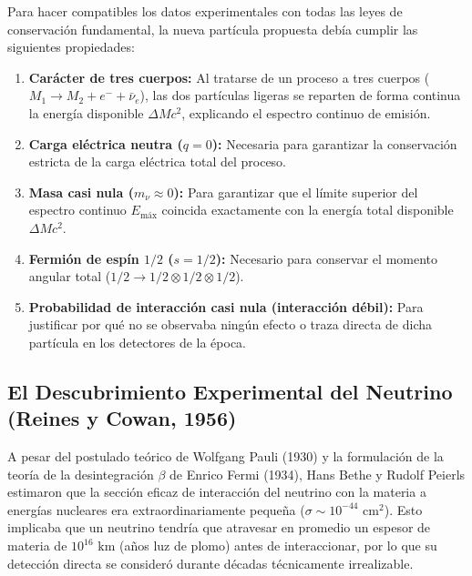 \begin{definicion}
Para hacer compatibles los datos experimentales con todas las leyes de conservación fundamental, la nueva partícula propuesta debía cumplir las siguientes propiedades:
\begin{enumerate}[label=\alph*)]
    \item \textbf{Carácter de tres cuerpos:} Al tratarse de un proceso a tres cuerpos ($M_1 \to M_2 + e^- + \bar{\nu}_e$), las dos partículas ligeras se reparten de forma continua la energía disponible $\Delta M c^2$, explicando el espectro continuo de emisión.
    \item \textbf{Carga eléctrica neutra ($q = 0$):} Necesaria para garantizar la conservación estricta de la carga eléctrica total del proceso.
    \item \textbf{Masa casi nula ($m_\nu \approx 0$):} Para garantizar que el límite superior del espectro continuo $E_{\text{máx}}$ coincida exactamente con la energía total disponible $\Delta M c^2$.
    \item \textbf{Fermión de espín $1/2$ ($s = 1/2$):} Necesario para conservar el momento angular total ($1/2 \to 1/2 \otimes 1/2 \otimes 1/2$).
    \item \textbf{Probabilidad de interacción casi nula (interacción débil):} Para justificar por qué no se observaba ningún efecto o traza directa de dicha partícula en los detectores de la época.
\end{enumerate}
\end{definicion}

\newpage

\subsection{El Descubrimiento Experimental del Neutrino (Reines y Cowan, 1956)}

A pesar del postulado teórico de Wolfgang Pauli (1930) y la formulación de la teoría de la desintegración $\beta$ de Enrico Fermi (1934), Hans Bethe y Rudolf Peierls estimaron que la sección eficaz de interacción del neutrino con la materia a energías nucleares era extraordinariamente pequeña ($\sigma \sim 10^{-44} \text{ cm}^2$). Esto implicaba que un neutrino tendría que atravesar en promedio un espesor de materia de $10^{16} \text{ km}$ (años luz de plomo) antes de interaccionar, por lo que su detección directa se consideró durante décadas técnicamente irrealizable.

